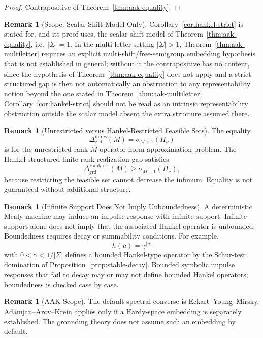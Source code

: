 \documentclass[12pt]{article}
\theoremstyle{definition}
\newtheorem{remark}[theorem]{Remark}
\newcommand{\Dunres}{\Delta_{\mathrm{grd}}^{\mathrm{unres}}}
\newcommand{\DHankstr}{\Delta_{\mathrm{grd}}^{\mathrm{Hank,str}}}
\begin{document}
\begin{proof}
Contrapositive of Theorem~\ref{thm:aak-equality}.
\end{proof}

\begin{remark}[Scope: Scalar Shift Model Only]
\label{rem:hankel-strict-scope}
Corollary~\ref{cor:hankel-strict} is stated for, and its proof uses, the
scalar shift model of Theorem~\ref{thm:aak-equality}, i.e.\ $|\Sigma|=1$.  In
the multi-letter setting $|\Sigma|>1$, Theorem~\ref{thm:aak-multiletter}
requires an explicit multi-shift/free-semigroup embedding hypothesis that is
not established in general; without it the contrapositive has no content,
since the hypothesis of Theorem~\ref{thm:aak-equality} does not apply and a
strict structured gap is then not automatically an obstruction to any
representability notion beyond the one stated in
Theorem~\ref{thm:aak-multiletter}.  Corollary~\ref{cor:hankel-strict} should
not be read as an intrinsic representability obstruction outside the scalar
model absent the extra structure assumed there.
\end{remark}

\begin{remark}[Unrestricted versus Hankel-Restricted Feasible Sets]
\label{rem:grounding-unrestricted-restricted}
The equality
\[
\Dunres(M)
=
\sigma_{M+1}(H_\nu)
\]
is for the unrestricted rank-$M$ operator-norm approximation problem.  The
Hankel-structured finite-rank realization gap satisfies
\[
\DHankstr(M)
\ge
\sigma_{M+1}(H_\nu),
\]
because restricting the feasible set cannot decrease the infimum.  Equality is
not guaranteed without additional structure.
\end{remark}

\begin{remark}[Infinite Support Does Not Imply Unboundedness]
\label{rem:infinite-support-grounding}
A deterministic Mealy machine may induce an impulse response with infinite
support.  Infinite support alone does not imply that the associated Hankel
operator is unbounded.  Boundedness requires decay or summability conditions.
For example,
\[
h(u)=\gamma^{|u|}
\]
with $0<\gamma<1/|\Sigma|$ defines a bounded Hankel-type operator by the
Schur-test domination of Proposition~\ref{prop:stable-decay}.  Bounded symbolic
impulse responses that fail to decay may or may not define bounded Hankel
operators; boundedness is checked case by case.
\end{remark}

\begin{remark}[AAK Scope]
\label{rem:grounding-aak}
The default spectral converse is Eckart--Young--Mirsky.  Adamjan--Arov--Krein
applies only if a Hardy-space embedding is separately established.  The
grounding theory does not assume such an embedding by default.
\end{remark}
\end{document}
